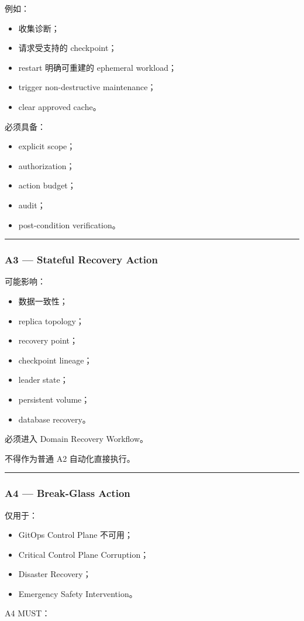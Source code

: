 \documentclass[11pt,a4paper]{article}
\begin{document}
例如：

\begin{itemize}
  \item 收集诊断；
  \item 请求受支持的 checkpoint；
  \item restart 明确可重建的 ephemeral workload；
  \item trigger non-destructive maintenance；
  \item clear approved cache。
\end{itemize}
必须具备：

\begin{itemize}
  \item explicit scope；
  \item authorization；
  \item action budget；
  \item audit；
  \item post-condition verification。
\end{itemize}
\vspace{0.5em}\hrule\vspace{0.5em}
\subsubsection{A3 — Stateful Recovery Action}
可能影响：

\begin{itemize}
  \item 数据一致性；
  \item replica topology；
  \item recovery point；
  \item checkpoint lineage；
  \item leader state；
  \item persistent volume；
  \item database recovery。
\end{itemize}
必须进入 Domain Recovery Workflow。

不得作为普通 A2 自动化直接执行。

\vspace{0.5em}\hrule\vspace{0.5em}
\subsubsection{A4 — Break-Glass Action}
仅用于：

\begin{itemize}
  \item GitOps Control Plane 不可用；
  \item Critical Control Plane Corruption；
  \item Disaster Recovery；
  \item Emergency Safety Intervention。
\end{itemize}
A4 MUST：
\end{document}
